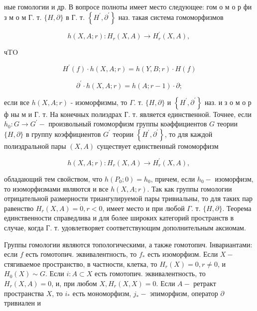 \documentclass[10pt]{article}
\begin{document}
ные гомологии и др. В вопросе полноты имеет место следующее: гом о м о р фи з м о м Г. т. $\{H, \partial\}$ в Г. т. $\left\{H^{\prime}, \partial^{\prime}\right\}$ наз. такая система гомоморфизмов



\[

h(X, A ; r): H_{r}(X, A) \longrightarrow H_{r}^{\prime}(X, A) \text {, }

\]



чTO



\[

H^{\prime}(f) \cdot h(X, A ; r)=h(Y, B ; r) \cdot H(f)

\]



\[

\partial^{\prime} \cdot h(X, A ; r)=h(A ; r-1) \cdot \partial ;

\]



если все $h(X, A ; r)$ - изоморфизмы, то $\Gamma$. т. $\{H, \partial\}$ и $\left\{H^{\prime}, \partial^{\prime}\right\}$ наз. и з о м о р ф ны м и Г. т. На конечных полиэдрах Г. т. является единственной. Точнее, если $h_{0}: G \rightarrow G^{\prime}-$ произвольный гомоморфизм группы коәффициентов $G$ теории $\{H, \partial\}$ в группу коэффициентов $G^{\prime}$ теории $\left\{H^{\prime}, \partial^{\prime}\right\}$, то для каждой полиэдральной пары $(X, A)$ существует единственный гомоморфизм



\[

h(X, A ; r): H_{r}(X, A) \longrightarrow H_{r}^{\prime}(X, A) \text {, }

\]



обладающий тем свойством, что $h\left(P_{0} ; 0\right)=h_{0}$, причем, если $h_{0}-$ изоморфизм, то изоморфизмами являются и все $h(X, A ; r)$. Так как группы гомологии отрицательной размерности триангулируемой пары тривиальны, то для таких пар равенство $H_{r}(X, A)=\dot{0}, r<0$, имеет место и при любой $\Gamma$. т. $\{H, \partial\}$. Теорема единственности справедлива и для более широких категорий пространств в случае, когда Г. т. удовлетворяет соответствующим дополнительным аксиомам.



Группы гомологии являются топологическими, а также гомотопич. Інвариантами: если $f$ есть гомотопич. эквивалентность, то $f_{*}$ есть изоморфизм. Если $X-$ стягиваемое пространство, в частности, клетка, то $H_{r}(X)=0, r \neq 0$, и $H_{0}(X) \sim G$. Если $i: A \subset X$ есть гомотопич. эквивалентность, то $H_{r}(X, A)=0$, и, при любом $X, H_{r}(X, X)=0$. Если $A-$ ретракт пространства $X$, то $i_{*}$ есть мономорфизм, $j_{*}-$ эпиморфизм, оператор $\partial$ тривиален и
\end{document}
